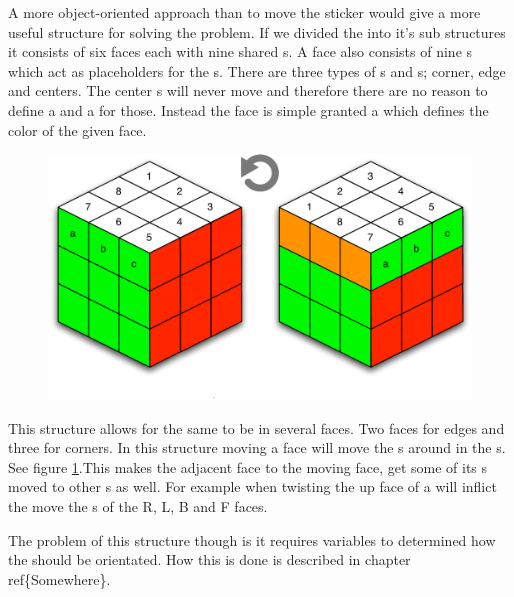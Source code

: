 A more object-oriented approach than to move the sticker would give a more useful structure for solving the problem.
If we divided the \rubik{} into it's sub structures it consists of six faces each with nine shared \cubie{}s.
A face also consists of nine \cubicle{}s which act as placeholders for the \cpiece{}s. 
There are three types of \cpiece{}s and \cubicle{}s; corner, edge and centers. 
The center \cpiece{}s will never move and therefore there are no reason to define a \cubicle{} and a \cpiece{} for those. Instead the face is simple granted a \facelet{} which defines the color of the given face.
\begin{figure}[h]
	\centering
		\includegraphics[scale=0.6]{input/pics/twistOfUpFace.pdf}
	\caption{}
	\label{fig:twistOfUpFace}
\end{figure}
This structure allows for the same \cubicle{} to be in several faces. 
Two faces for edges and three for corners. 
In this structure moving a face will move the \cpiece{}s around in the \cubicle{}s. See figure \ref{fig:twistOfUpFace}.This makes the adjacent face to the moving face, get some of its \cpiece{}s moved to other \cubicle{}s as well. 
For example when twisting the up face of a \rubik{} will inflict the move the \cpiece{}s of the R, L, B and F faces. 

The problem of this structure though is it requires variables to determined how the \facelet{} should be orientated. 
How this is done is described in chapter ref\{Somewhere\}.
